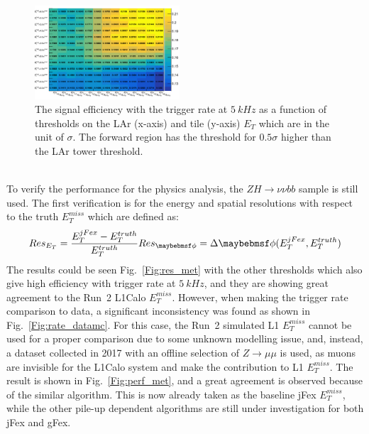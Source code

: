 \begin{figure}[!h]                
	\includegraphics[width=0.48\textwidth]{Chapter6/efficiency_5kHz_cfg1.png}
		\begin{center}
		\caption{The signal efficiency with the trigger rate at $5~kHz$ as a function of thresholds on the LAr (x-axis) and tile (y-axis) $E_{T}$ which are in the unit of $\sigma$. The forward region has the threshold for $0.5\sigma$ higher than the LAr tower threshold.}
		\label{Fig:thresold_scan_1}            
	\end{center}
\end{figure}
\noindent
\\To verify the performance for the physics analysis, the $ZH\to\nu\nu bb$ sample is still used. The first verification is for the energy and spatial resolutions with respect to the truth $E^{miss}_{T}$ which are defined as:
\begin{equation}
Res_{E_{T}} = \frac{E^{jFex}_{T}-E^{truth}_{T}}{E^{truth}_{T}} \\
Res_{\phi} = \Delta\phi(E^{jFex}_{T}, E^{truth}_{T})
\end{equation}
The results could be seen Fig.~\ref{Fig:res_met} with the other thresholds which also give high efficiency with trigger rate at $5~kHz$, and they are showing great agreement to the Run~2 L1Calo $E^{miss}_{T}$. However, when making the trigger rate comparison to data, a significant inconsistency was found as shown in Fig.~\ref{Fig:rate_datamc}. For this case, the Run~2 simulated L1 $E^{miss}_{T}$ cannot be used for a proper comparison due to some unknown modelling issue, and, instead, a dataset collected in 2017 with an offline selection of $Z\to\mu\mu$ is used, as muons are invisible for the L1Calo system and make the contribution to L1 $E^{miss}_{T}$. The result is shown in Fig.~\ref{Fig:perf_met}, and a great agreement is observed because of the similar algorithm. This is now already taken as the baseline jFex $E^{miss}_{T}$, while the other pile-up dependent algorithms are still under investigation for both jFex and gFex. 
